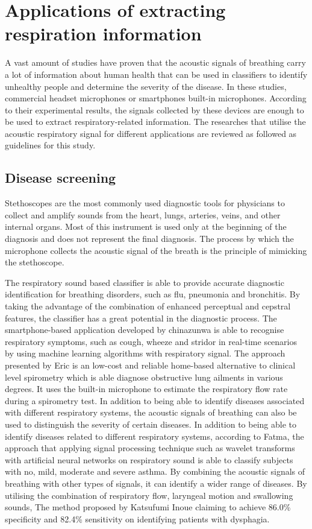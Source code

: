 \section{Applications of extracting respiration information}
A vast amount of studies have proven that the acoustic signals of breathing carry a lot of information about human health that can be used in classifiers to identify unhealthy people and determine the severity of the disease. In these studies, commercial headset microphones or smartphones built-in microphones. According to their experimental results, the signals collected by these devices are enough to be used to extract respiratory-related information. The researches that utilise the acoustic respiratory signal for different applications are reviewed as followed as guidelines for this study.

\subsection{Disease screening}
Stethoscopes are the most commonly used diagnostic tools for physicians to collect and amplify sounds from the heart, lungs, arteries, veins, and other internal organs. Most of this instrument is used only at the beginning of the diagnosis and does not represent the final diagnosis. The process by which the microphone collects the acoustic signal of the breath is the principle of mimicking the stethoscope.  

The respiratory sound based classifier is able to provide accurate diagnostic identification for breathing disorders, such as flu, pneumonia and bronchitis. By taking the advantage of the combination of enhanced perceptual and cepstral features, the classifier has a great potential in the diagnostic process.\cite{Lei2014Content-basedFeatures} The smartphone-based application developed by chinazunwa is able to recognise respiratory symptoms, such as cough, wheeze and stridor in real-time scenarios by using machine learning algorithms with respiratory signal.\cite{Uwaoma2017OnAlgorithms} The approach presented by Eric is an low-cost and reliable home-based alternative to clinical level spirometry which is able diagnose obstructive lung ailments in various degrees. It uses the built-in microphone to estimate the respiratory flow rate during a spirometry test.\cite{Boriello2012SpiroSmart} In addition to being able to identify diseases associated with different respiratory systems, the acoustic signals of breathing can also be used to distinguish the severity of certain diseases. In addition to being able to identify diseases related to different respiratory systems, according to Fatma, the approach that applying signal processing technique such as wavelet transforms with artificial neural networks on respiratory sound is able to classify subjects with no, mild, moderate and severe asthma.\cite{Gogus2015ClassificationNetworks} By combining the acoustic signals of breathing with other types of signals, it can identify a wider range of diseases. By utilising the combination of respiratory flow, laryngeal motion and swallowing sounds, The method proposed by Katsufumi Inoue claiming to achieve 86.0\% specificity and 82.4\% sensitivity on identifying patients with dysphagia.\cite{Oku2018UsingSwallowing}


